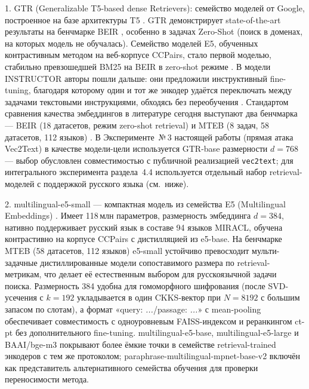 \documentclass[a4paper, 12pt, oneside, openany]{article}
\begin{document}
1. GTR (Generalizable T5-based dense Retrievers): семейство моделей от Google, построенное на базе архитектуры T5 \cite{ref19}. GTR демонстрирует state-of-the-art результаты на бенчмарке BEIR \cite{ref31}, особенно в задачах Zero-Shot (поиск в доменах, на которых модель не обучалась). Семейство моделей E5, обученных контрастивным методом на веб-корпусе CCPairs, стало первой моделью, стабильно превзошедшей BM25 на BEIR в zero-shot режиме \cite{ref30}. В модели INSTRUCTOR авторы пошли дальше: они предложили инструктивный fine-tuning, благодаря которому один и тот же энкодер удаётся переключать между задачами текстовыми инструкциями, обходясь без переобучения \cite{ref34}. Стандартом сравнения качества эмбеддингов в литературе сегодня выступают два бенчмарка — BEIR (18 датасетов, режим zero-shot retrieval) \cite{ref31} и MTEB (8 задач, 58 датасетов, 112 языков) \cite{ref32}. В Эксперименте~№\,3 настоящей работы (прямая атака Vec2Text) в качестве модели-цели используется GTR-base размерности $d = 768$ --- выбор обусловлен совместимостью с публичной реализацией \texttt{vec2text}; для интегрального эксперимента раздела~4.4 используется отдельный набор retrieval-моделей с поддержкой русского языка (см.\ ниже).

2. multilingual-e5-small --- компактная модель из семейства E5 (Multilingual Embeddings) \cite{ref30}. Имеет 118\,млн параметров, размерность эмбеддинга $d = 384$, нативно поддерживает русский язык в составе 94 языков MIRACL, обучена контрастивно на корпусе CCPairs с дистилляцией из e5-base. На бенчмарке MTEB \cite{ref32} (58 датасетов, 112 языков) e5-small устойчиво превосходит мульти-задачные дистиллированные модели сопоставимого размера по retrieval-метрикам, что делает её естественным выбором для русскоязычной задачи поиска. Размерность 384 удобна для гомоморфного шифрования (после SVD-усечения с $k=192$ укладывается в один CKKS-вектор при $N=8192$ с большим запасом по слотам), а формат «query: \textit{...}/passage: \textit{...}» с mean-pooling обеспечивает совместимость с одноуровневым FAISS-индексом и реранкингом ct-pt без дополнительного fine-tuning. multilingual-e5-base, multilingual-e5-large и BAAI/bge-m3 покрывают более ёмкие точки в семействе retrieval-trained энкодеров с тем же протоколом; paraphrase-multilingual-mpnet-base-v2 включён как представитель альтернативного семейства обучения для проверки переносимости метода.
\end{document}
